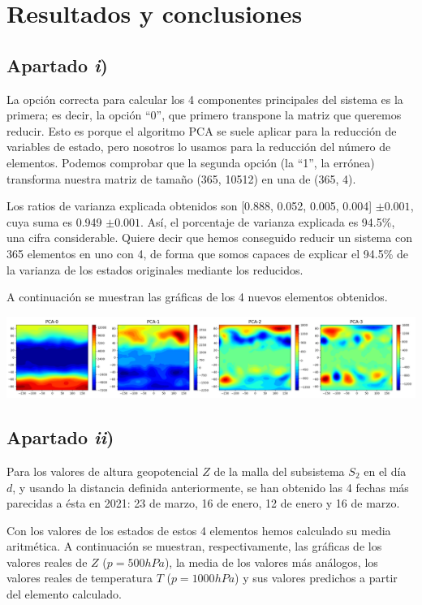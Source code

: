\documentclass[a4paper]{article}
\begin{document}
	\section{Resultados y conclusiones}
	\subsection{Apartado \textit{i})}
	
	La opción correcta para calcular los 4 componentes principales del sistema es la primera; es decir, la opción ``0'', que primero transpone la matriz que queremos reducir. Esto es porque el algoritmo PCA se suele aplicar para la reducción de variables de estado, pero nosotros lo usamos para la reducción del número de elementos. Podemos comprobar que la segunda opción (la ``1'', la errónea) transforma nuestra matriz de tamaño (365, 10512) en una de (365, 4).
	
	Los ratios de varianza explicada obtenidos son [0.888, 0.052, 0.005, 0.004] $\pm0.001$, cuya suma es 0.949 $\pm0.001$. Así, el porcentaje de varianza explicada es 94.5\%, una cifra considerable. Quiere decir que hemos conseguido reducir un sistema con 365 elementos en uno con 4, de forma que somos capaces de explicar el 94.5\% de la varianza de los estados originales mediante los reducidos.
	
	A continuación se muestran las gráficas de los 4 nuevos elementos obtenidos.
		
	\includegraphics[width=\linewidth]{2}
	
	
	\subsection{Apartado \textit{ii})}
	Para los valores de altura geopotencial $Z$ de la malla del subsistema $S_2$ en el día $d$, y usando la distancia definida anteriormente, se han obtenido las 4 fechas más parecidas a ésta en 2021:
	23 de marzo, 16 de enero, 12 de enero y 16 de marzo.
	
	Con los valores de los estados de estos 4 elementos hemos calculado su media aritmética. A continuación se muestran, respectivamente, las gráficas de los valores reales de $Z$ ($p=500hPa$), la media de los valores más análogos, los valores reales de temperatura $T$ ($p=1000hPa$) y sus valores predichos a partir del elemento calculado.
	
\end{document}
